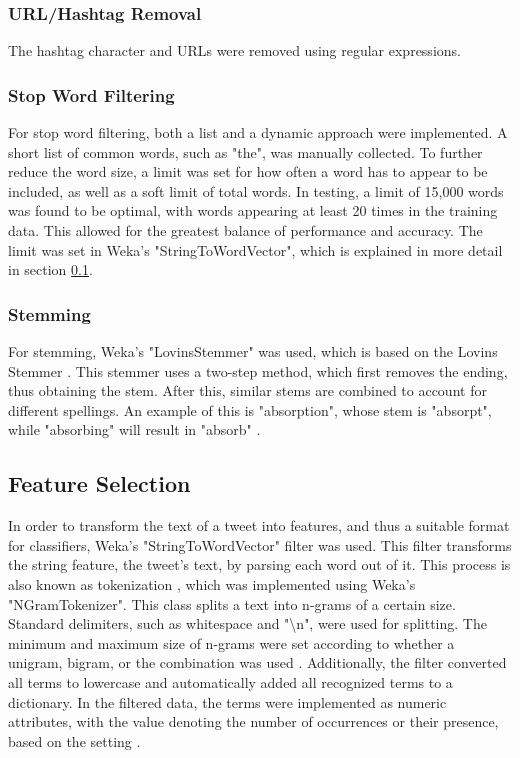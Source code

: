 \subsubsection{URL/Hashtag Removal}
The hashtag character and URLs were removed using regular expressions.

\subsubsection{Stop Word Filtering}
For stop word filtering, both a list and a dynamic approach were implemented. A short list of common words, such as "the", was manually collected. To further reduce the word size, a limit was set for how often a word has to appear to be included, as well as a soft limit of total words. In testing, a limit of 15,000 words was found to be optimal, with words appearing at least 20 times in the training data. This allowed for the greatest balance of performance and accuracy. The limit was set in Weka's "StringToWordVector", which is explained in more detail in section \ref{sub:feature_selec}.

\subsubsection{Stemming}
For stemming, Weka's "LovinsStemmer" was used, which is based on the Lovins Stemmer \cite{Weka}. This stemmer uses a two-step method, which first removes the ending, thus obtaining the stem. After this, similar stems are combined to account for different spellings. An example of this is "absorption", whose stem is "absorpt", while "absorbing" will result in "absorb" \cite{Lovins1968DevelopmentOA}.

\subsection{Feature Selection}
\label{sub:feature_selec}


In order to transform the text of a tweet into features, and thus a suitable format for classifiers, Weka's "StringToWordVector" filter was used. This filter transforms the string feature, the tweet's text, by parsing each word out of it. This process is also known as tokenization \cite{DBLP:journals/csur/GiachanouC16}, which was implemented using Weka's "NGramTokenizer". This class splits a text into n-grams of a certain size. Standard delimiters, such as whitespace and "\textbackslash n", were used for splitting. The minimum and maximum size of n-grams were set according to whether a unigram, bigram, or the combination was used \cite{Weka}. Additionally, the filter converted all terms to lowercase and automatically added all recognized terms to a dictionary. In the filtered data, the terms were implemented as numeric attributes, with the value denoting the number of occurrences or their presence, based on the setting \cite{Weka}.


